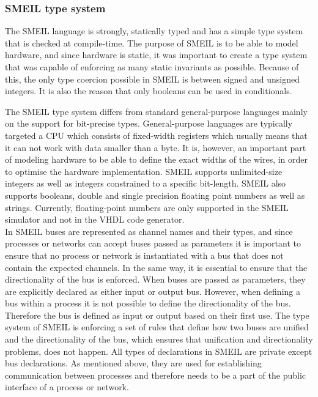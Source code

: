 \subsubsection{SMEIL type system}
The SMEIL language is strongly, statically typed and has a simple type system that is checked at compile-time. The purpose of SMEIL is to be able to model hardware, and since hardware is static, it was important to create a type system that was capable of enforcing as many static invariants as possible.
Because of this, the only type coercion possible in SMEIL is between signed and unsigned integers. It is also the reason that only booleans can be used in conditionals.

The SMEIL type system differs from standard general-purpose languages mainly on the support for bit-precise types. General-purpose languages are typically targeted a CPU which consists of fixed-width registers which usually means that it can not work with data smaller than a byte. It is, however, an important part of modeling hardware to be able to define the exact widths of the wires, in order to optimise the hardware implementation. SMEIL supports unlimited-size integers as well as integers constrained to a specific bit-length. SMEIL also supports booleans, double and single precision floating point numbers as well as strings. Currently, floating-point numbers are only supported in the SMEIL simulator and not in the VHDL code generator. \\

In SMEIL buses are represented as channel names and their types, and since processes or networks can accept buses passed as parameters it is important to ensure that no process or network is instantiated with a bus that does not contain the expected channels.
In the same way, it is essential to ensure that the directionality of the bus is enforced. When buses are passed as parameters, they are explicitly declared as either input or output bus. However, when defining a bus within a process it is not possible to define the directionality of the bus. Therefore the bus is defined as input or output based on their first use.
The type system of SMEIL is enforcing a set of rules that define how two buses are unified and the directionality of the bus, which ensures that unification and directionality problems, does not happen.
All types of declarations in SMEIL are private except bus declarations. As mentioned above, they are used for establishing communication between processes and therefore needs to be a part of the public interface of a process or network.

